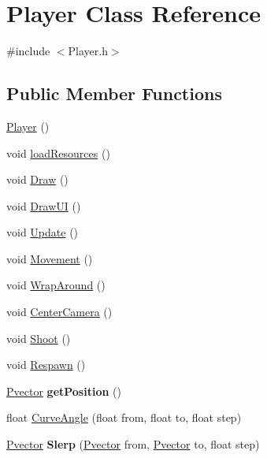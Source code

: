 \hypertarget{class_player}{}\section{Player Class Reference}
\label{class_player}


{\ttfamily \#include $<$Player.\+h$>$}

\subsection*{Public Member Functions}
\begin{DoxyCompactItemize}
\item 
\hyperlink{class_player_affe0cc3cb714f6deb4e62f0c0d3f1fd8}{Player} ()
\item 
void \hyperlink{class_player_a6d26d9aae1117ad8d49683888f464210}{load\+Resources} ()
\item 
void \hyperlink{class_player_a00ae3ebe88af8f9cfabd819176516a73}{Draw} ()
\item 
void \hyperlink{class_player_a6c671476697db2887b71f6b7cf69550c}{Draw\+UI} ()
\item 
void \hyperlink{class_player_a05b60cac1922c5be5c1be16baffa4497}{Update} ()
\item 
void \hyperlink{class_player_a08199310a7297522b60671c3fc3e5131}{Movement} ()
\item 
void \hyperlink{class_player_a24cc2c3efad6862c6b4ee7d2a1378ede}{Wrap\+Around} ()
\item 
void \hyperlink{class_player_af8664a649de1954c150e8e77ba0614e6}{Center\+Camera} ()
\item 
void \hyperlink{class_player_a2105394431517a41d38140cb65982331}{Shoot} ()
\item 
void \hyperlink{class_player_a98dc6c9d4af55d012bd52cf867cec151}{Respawn} ()
\item 
\hyperlink{class_pvector}{Pvector} {\bfseries get\+Position} ()\hypertarget{class_player_a56cdb7168e3e2b796cb9db52ca6d5700}{}\label{class_player_a56cdb7168e3e2b796cb9db52ca6d5700}

\item 
float \hyperlink{class_player_a7454b006a10feed9e2ffae58c00afaf9}{Curve\+Angle} (float from, float to, float step)
\item 
\hyperlink{class_pvector}{Pvector} {\bfseries Slerp} (\hyperlink{class_pvector}{Pvector} from, \hyperlink{class_pvector}{Pvector} to, float step)\hypertarget{class_player_ac44d1b3058189fac7cb238fefc9d2cb4}{}\label{class_player_ac44d1b3058189fac7cb238fefc9d2cb4}


\end{DoxyCompactItemize}
